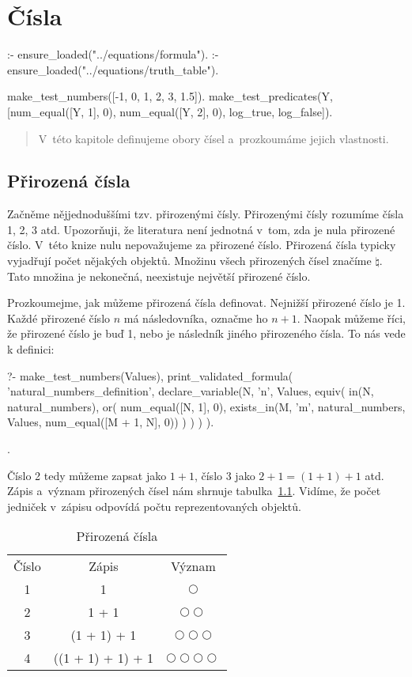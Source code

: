 \chapter{Čísla}

\begin{prolog}
:- ensure_loaded("../equations/formula").
:- ensure_loaded("../equations/truth_table").

make_test_numbers([-1, 0, 1, 2, 3, 1.5]).
make_test_predicates(Y, [num_equal([Y, 1], 0), num_equal([Y, 2], 0), log_true, log_false]).
\end{prolog}


\begin{abstract}
V~této kapitole definujeme obory čísel a~prozkoumáme jejich vlastnosti.
\end{abstract}

\section{Přirozená čísla}

Začněme nějjednoduššími tzv. přirozenými čísly. Přirozenými čísly rozumíme čísla 1, 2, 3 atd. Upozorňuji, že literatura není jednotná v~tom, zda je nula přirozené číslo. V~této knize nulu nepovažujeme za přirozené číslo. Přirozená čísla typicky vyjadřují počet nějakých objektů. Množinu všech přirozených čísel značíme \(\natural\). Tato množina je nekonečná, neexistuje největší přirozené číslo.

Prozkoumejme, jak můžeme přirozená čísla definovat. Nejnižší přirozené číslo je 1. Každé přirozené číslo \(n\) má
následovníka, označme ho \(n + 1\). Naopak můžeme říci, že přirozené číslo je buď 1, nebo je následník jiného 
přirozeného čísla. To nás vede k definici:

\begin{prolog}
?-	make_test_numbers(Values),
	print_validated_formula(
		'natural_numbers_definition',
		declare_variable(N, 'n', Values,
			equiv(
				in(N, natural_numbers),
				or(
					num_equal([N, 1], 0),
					exists_in(M, 'm', natural_numbers, Values, num_equal([M + 1, N], 0)) 
				)
			)
		)
	).
\end{prolog}
.

Číslo 2 tedy můžeme zapsat jako \(1 + 1\), číslo 3 jako \(2 + 1 = (1 + 1) + 1\) atd. Zápis a~význam přirozených čísel nám shrnuje tabulka~\ref{tab:natural_numbers}. Vidíme, že počet jedniček v~zápisu odpovídá počtu reprezentovaných objektů.

\begin{table}[ht]
\centering
\begin{tabular}{|c|c|c|}
Číslo & Zápis & Význam \\
1 & 1 & \(\bigcirc\) \\
2 & 1 + 1 & \(\bigcirc \bigcirc\) \\
3 & (1 + 1) + 1 & \(\bigcirc \bigcirc \bigcirc\) \\
4 & ((1 + 1) + 1) + 1 & \(\bigcirc \bigcirc \bigcirc \bigcirc\)
\end{tabular}
\caption{Přirozená čísla}
\label{tab:natural_numbers}
\end{table}


